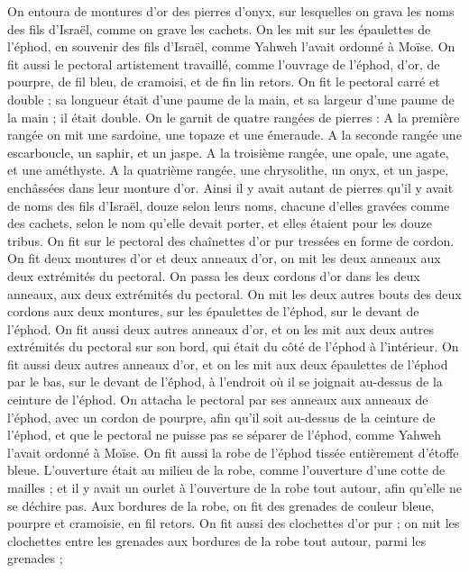 \begin{multicols}{2}
On entoura de montures d’or des pierres d’onyx, sur lesquelles on grava les noms des fils d’Israël, comme on grave les cachets.
On les mit sur les épaulettes de l'éphod, en souvenir des fils d'Israël, comme Yahweh l’avait ordonné à Moïse.
On fit aussi le pectoral artistement travaillé, comme l'ouvrage de l'éphod, d'or, de pourpre, de fil bleu, de cramoisi, et de fin lin retors.
On fit le pectoral carré et double ; sa longueur était d'une paume de la main, et sa largeur d'une paume de la main ; il était double.
On le garnit de quatre rangées de pierres : A la première rangée on mit une sardoine, une topaze et une émeraude.
A la seconde rangée une escarboucle, un saphir, et un jaspe.
A la troisième rangée, une opale, une agate, et une améthyste.
A la quatrième rangée, une chrysolithe, un onyx, et un jaspe, enchâssées dans leur monture d’or.
Ainsi il y avait autant de pierres qu'il y avait de noms des fils d'Israël, douze selon leurs noms, chacune d'elles gravées comme des cachets, selon le nom qu'elle devait porter, et elles étaient pour les douze tribus.
On fit sur le pectoral des chaînettes d’or pur tressées en forme de cordon.
On fit deux montures d'or et deux anneaux d'or, on mit les deux anneaux aux deux extrémités du pectoral.
On passa les deux cordons d'or dans les deux anneaux, aux deux extrémités du pectoral.
On mit les deux autres bouts des deux cordons aux deux montures, sur les épaulettes de l'éphod, sur le devant de l'éphod.
On fit aussi deux autres anneaux d'or, et on les mit aux deux autres extrémités du pectoral sur son bord, qui était du côté de l'éphod à l’intérieur.
On fit aussi deux autres anneaux d'or, et on les mit aux deux épaulettes de l'éphod par le bas, sur le devant de l'éphod, à l'endroit où il se joignait au-dessus de la ceinture de l'éphod.
On attacha le pectoral par ses anneaux aux anneaux de l'éphod, avec un cordon de pourpre, afin qu'il soit au-dessus de la ceinture de l'éphod, et que le pectoral ne puisse pas se séparer de l'éphod, comme Yahweh l'avait ordonné à Moïse.
On fit aussi la robe de l'éphod tissée entièrement d’étoffe bleue.
L'ouverture était au milieu de la robe, comme l'ouverture d’une cotte de mailles ; et il y avait un ourlet à l'ouverture de la robe tout autour, afin qu'elle ne se déchire pas.
Aux bordures de la robe, on fit des grenades de couleur bleue, pourpre et cramoisie, en fil retors.
On fit aussi des clochettes d’or pur ; on mit les clochettes entre les grenades aux bordures de la robe tout autour, parmi les grenades ;

\end{multicols}
